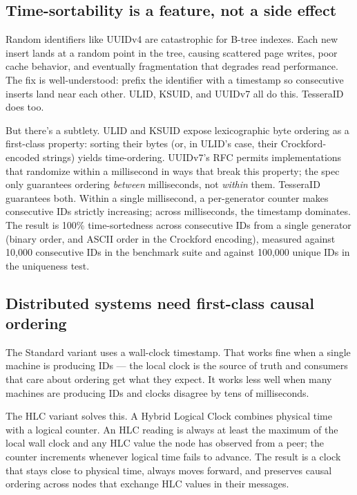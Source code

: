 \subsection{Time-sortability is a feature, not a side effect}

Random identifiers like UUIDv4 are catastrophic for B-tree indexes. Each new insert lands at a random point in the tree, causing scattered page writes, poor cache behavior, and eventually fragmentation that degrades read performance. The fix is well-understood: prefix the identifier with a timestamp so consecutive inserts land near each other. ULID, KSUID, and UUIDv7 all do this. TesseraID does too.

But there's a subtlety. ULID and KSUID expose lexicographic byte ordering as a first-class property: sorting their bytes (or, in ULID's case, their Crockford-encoded strings) yields time-ordering. UUIDv7's RFC permits implementations that randomize within a millisecond in ways that break this property; the spec only guarantees ordering \emph{between} milliseconds, not \emph{within} them. TesseraID guarantees both. Within a single millisecond, a per-generator counter makes consecutive IDs strictly increasing; across milliseconds, the timestamp dominates. The result is 100\% time-sortedness across consecutive IDs from a single generator (binary order, and ASCII order in the Crockford encoding), measured against 10{,}000 consecutive IDs in the benchmark suite and against 100{,}000 unique IDs in the uniqueness test.

\subsection{Distributed systems need first-class causal ordering}

The Standard variant uses a wall-clock timestamp. That works fine when a single machine is producing IDs --- the local clock is the source of truth and consumers that care about ordering get what they expect. It works less well when many machines are producing IDs and clocks disagree by tens of milliseconds.

The HLC variant solves this. A Hybrid Logical Clock \citep{kulkarni2014hlc} combines physical time with a logical counter. An HLC reading is always at least the maximum of the local wall clock and any HLC value the node has observed from a peer; the counter increments whenever logical time fails to advance. The result is a clock that stays close to physical time, always moves forward, and preserves causal ordering across nodes that exchange HLC values in their messages.


